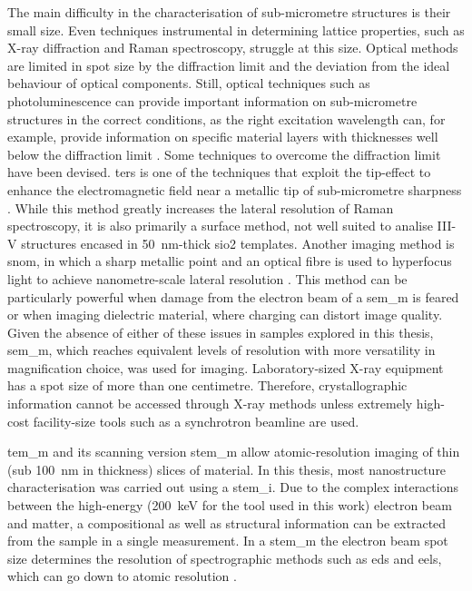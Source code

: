 The main difficulty in the characterisation of sub-micrometre structures is their small size. Even techniques instrumental in determining lattice properties, such as X-ray diffraction and Raman spectroscopy, struggle at this size. Optical methods are limited in spot size by the diffraction limit and the deviation from the ideal behaviour of optical components. Still, optical techniques such as photoluminescence can provide important information on sub-micrometre structures in the correct conditions, as the right excitation wavelength can, for example, provide information on specific material layers with thicknesses well below the diffraction limit \cite{Scherrer2021}. Some techniques to overcome the diffraction limit have been devised. \Acf{ters} is one of the techniques that exploit the tip-effect to enhance the electromagnetic field near a metallic tip of sub-micrometre sharpness \cite{Yang2009}. While this method greatly increases the lateral resolution of Raman spectroscopy, it is also primarily a surface method, not well suited to analise III-V structures encased in \qty{50}{\nano\metre}-thick \acs{sio2} templates. Another imaging method is \acf{snom}, in which a sharp metallic point and an optical fibre is used to hyperfocus light to achieve nanometre-scale lateral resolution \cite{Ma2021}. This method can be particularly powerful when damage from the electron beam of a \acs{sem_m} is feared or when imaging dielectric material, where charging can distort image quality. Given the absence of either of these issues in samples explored in this thesis, \acs{sem_m}, which reaches equivalent levels of resolution with more versatility in magnification choice, was used for imaging. Laboratory-sized X-ray equipment has a spot size of more than one centimetre. Therefore, crystallographic information cannot be accessed through X-ray methods unless extremely high-cost facility-size tools such as a synchrotron beamline are used. 

\Acf{tem_m} and its scanning version \acf{stem_m} allow atomic-resolution imaging of thin (sub \qty{100}{\nano\metre} in thickness) slices of material. In this thesis, most nanostructure characterisation was carried out using a \acl{stem_i}. Due to the complex interactions between the high-energy (\qty{200}{\kilo\eV} for the tool used in this work) electron beam and matter, a compositional as well as structural information can be extracted from the sample in a single measurement. In a \acs{stem_m} the electron beam spot size determines the resolution of spectrographic methods such as \acf{eds} and \acf{eels}, which can go down to atomic resolution \cite{Bologna2018}. 

